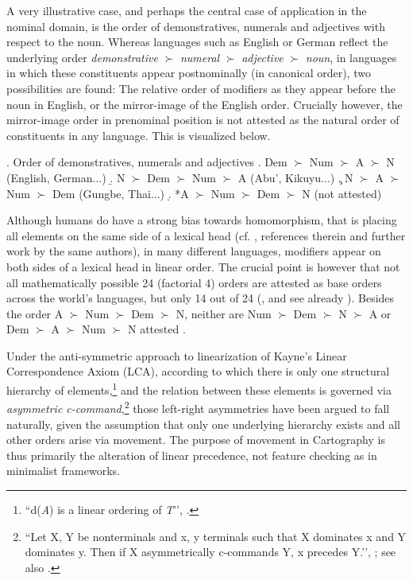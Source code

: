 \documentclass [output=book,colorlinks,citecolor=brown]{langscibook}
\begin{document}
A very illustrative case, and perhaps the central case of application in the nominal domain, is the order of demonstratives, numerals and adjectives with respect to the noun. Whereas languages such as English or German reflect the underlying order \textit{demonstrative} $\succ$ \textit{numeral} $\succ$ \textit{adjective} $\succ$ \textit{noun}, in languages in which these constituents appear postnominally (in canonical order), two possibilities are found: The relative order of modifiers as they appear before the noun in English, or the mirror-image of the English order. Crucially however, the mirror-image order in prenominal position is not attested as the natural order of constituents in any language. This is visualized below.

\ex. Order of demonstratives, numerals and adjectives \citep[166]{cinque:2009:fundamental}
\a. Dem $\succ$ Num $\succ$ A $\succ$ N (English, German...)
\b. N $\succ$ Dem $\succ$ Num $\succ$ A (Abu', Kikuyu...)
\c. N $\succ$ A $\succ$ Num $\succ$ Dem (Gungbe, Thai...)
\d. *A $\succ$ Num $\succ$ Dem $\succ$ N (not attested)

Although humans do have a strong bias towards homomorphism, that is placing all elements on the same side of a lexical head (cf. \citealt{martin:2020:experimental}, references therein and further work by the same authors), in many different languages, modifiers appear on both sides of a lexical head in linear order. The crucial point is however that not all mathematically possible 24 (factorial 4) orders are attested as base orders across the world’s languages, but only 14 out of 24 (\citealt{cinque:2005:deriving, cinque:2023:linearization}, and see already \citealt{greenberg:1963:some, hawkins:1983:word}). Besides the order A $\succ$ Num $\succ$ Dem $\succ$ N, neither are Num $\succ$ Dem $\succ$ N $\succ$ A or Dem $\succ$ A $\succ$ Num $\succ$ N attested \citep[319–320]{cinque:2005:deriving}.

Under the anti-symmetric approach to linearization of Kayne’s \citeyear{kayne:1994:anti} Linear Correspondence Axiom (LCA), according to which there is only one structural hierarchy of elements,\footnote{``d(\textit{A}) is a linear ordering of \textit{T}’’, \citep[6]{kayne:1994:anti}.} and the relation between these elements is governed via \textit{asymmetric c-command},\footnote{``Let X, Y be nonterminals and x, y terminals such that X dominates x and Y dominates y. Then if X asymmetrically c-commands Y, x precedes Y.’’, \citep[31]{kayne:1994:anti}; see also \citet{moro:1997:raising, moro:2000:dynamic}.} those left-right asymmetries have been argued to fall naturally, given the assumption that only one underlying hierarchy exists and all other orders arise via movement. The purpose of movement in Cartography is thus primarily the alteration of linear precedence, not feature checking as in minimalist frameworks. %
\end{document}
